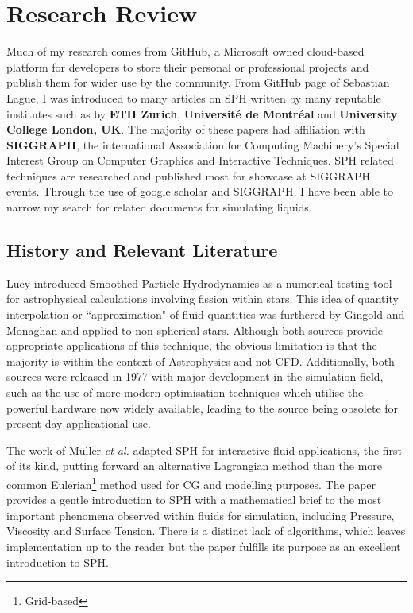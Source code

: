 \documentclass[write-up.tex]{subfiles}
\begin{document}
\section{Research Review}
Much of my research comes from GitHub, a Microsoft owned cloud-based platform for developers to store their personal or professional projects and publish them for wider use by the community. From GitHub page of Sebastian Lague, I was introduced to many articles on SPH written by many reputable institutes such as by \textbf{ETH Zurich}, \textbf{Université de Montréal} and \textbf{University College London, UK}. The majority of these papers had affiliation with \textbf{SIGGRAPH}, the international Association for Computing Machinery's Special Interest Group on Computer Graphics and Interactive Techniques. SPH related techniques are researched and published most for showcase at SIGGRAPH events. Through the use of google scholar and SIGGRAPH, I have been able to narrow my search for related documents for simulating liquids.
\subsection{History and Relevant Literature}
Lucy \cite{lucy} introduced Smoothed Particle Hydrodynamics as a numerical testing tool for astrophysical calculations involving fission within stars. This idea of quantity interpolation or ``approximation" of fluid quantities was furthered by Gingold and Monaghan \cite{gingold} and applied to non-spherical stars. Although both sources provide appropriate applications of this technique, the obvious limitation is that the majority is within the context of Astrophysics and not CFD. Additionally, both sources were released in 1977 with major development in the simulation field, such as the use of more modern optimisation techniques which utilise the powerful hardware now widely available, leading to the source being obsolete for present-day applicational use.

The work of Müller \textit{et al.} \cite{muller} adapted SPH for interactive fluid applications, the first of its kind, putting forward an alternative Lagrangian method than the more common Eulerian\footnote{Grid-based} method used for CG and modelling purposes. The paper provides a gentle introduction to SPH with a mathematical brief to the most important phenomena observed within fluids for simulation, including Pressure, Viscosity and Surface Tension. There is a distinct lack of algorithms, which leaves implementation up to the reader but the paper fulfills its purpose as an excellent introduction to SPH.
\end{document}
